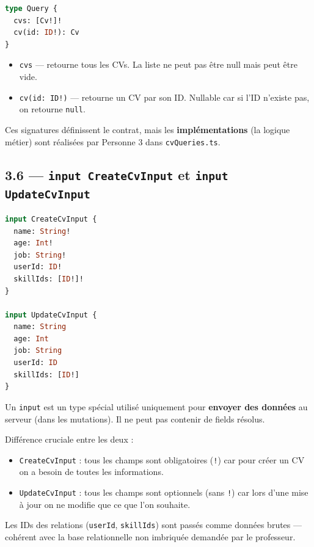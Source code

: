 \documentclass[12pt,a4paper]{article}
\begin{document}
\begin{lstlisting}[language=GraphQL, caption={Déclaration des Queries}]
type Query {
  cvs: [Cv!]!
  cv(id: ID!): Cv
}
\end{lstlisting}

\begin{itemize}
  \item \texttt{cvs} --- retourne tous les CVs. La liste ne peut pas être null mais peut être vide.
  \item \texttt{cv(id: ID!)} --- retourne un CV par son ID. Nullable car si l'ID n'existe pas, on retourne \texttt{null}.
\end{itemize}

Ces signatures définissent le contrat, mais les \textbf{implémentations} (la logique métier) sont réalisées par Personne 3 dans \texttt{cvQueries.ts}.

\subsection{3.6 --- \texttt{input CreateCvInput} et \texttt{input UpdateCvInput}}

\begin{lstlisting}[language=GraphQL, caption={Inputs pour les mutations}]
input CreateCvInput {
  name: String!
  age: Int!
  job: String!
  userId: ID!
  skillIds: [ID!]!
}

input UpdateCvInput {
  name: String
  age: Int
  job: String
  userId: ID
  skillIds: [ID!]
}
\end{lstlisting}

Un \texttt{input} est un type spécial utilisé uniquement pour \textbf{envoyer des données} au serveur (dans les mutations). Il ne peut pas contenir de fields résolus.

Différence cruciale entre les deux :
\begin{itemize}
  \item \texttt{CreateCvInput} : tous les champs sont obligatoires (\texttt{!}) car pour créer un CV on a besoin de toutes les informations.
  \item \texttt{UpdateCvInput} : tous les champs sont optionnels (sans \texttt{!}) car lors d'une mise à jour on ne modifie que ce que l'on souhaite.
\end{itemize}

Les IDs des relations (\texttt{userId}, \texttt{skillIds}) sont passés comme données brutes --- cohérent avec la base relationnelle non imbriquée demandée par le professeur.
\end{document}
